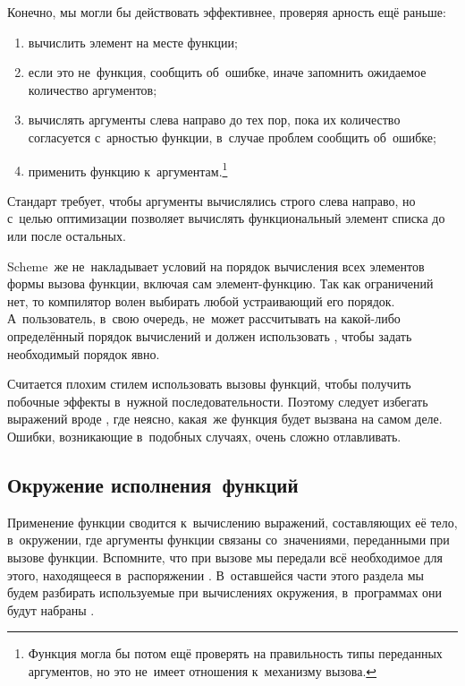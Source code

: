 Конечно, мы могли бы действовать эффективнее, проверяя арность ещё раньше:

\begin{enumerate}
  \item вычислить элемент на месте функции;

  \item если это не~функция, сообщить об~ошибке, иначе запомнить ожидаемое
        количество аргументов;

  \item вычислять аргументы слева направо до тех пор, пока их количество
        согласуется с~арностью функции, в~случае проблем сообщить об~ошибке;

  \item применить функцию к~аргументам.\footnote*{Функция могла бы потом
        ещё проверять на правильность типы переданных аргументов, но это
        не~имеет отношения к~механизму вызова.}
\end{enumerate}

Стандарт {\CommonLisp} требует, чтобы аргументы вычислялись строго слева
направо, но с~целью оптимизации позволяет вычислять функциональный элемент
списка до или после остальных.

Scheme~же не~накладывает условий на порядок вычисления всех элементов формы
вызова функции, включая сам элемент-функцию. Так как ограничений нет, то
компилятор волен выбирать любой устраивающий его порядок.
 А~пользователь, в~свою очередь, не~может
рассчитывать на какой-либо определённый порядок вычислений и должен использовать
, чтобы задать необходимый порядок явно.

Считается плохим стилем использовать вызовы функций, чтобы получить побочные
эффекты в~нужной последовательности. Поэтому следует избегать выражений вроде
, где неясно, какая~же функция будет
вызвана на самом деле. Ошибки, возникающие в~подобных случаях, очень сложно
отлавливать.


\subsection*{Окружение исполнения~функций}

Применение функции сводится к~вычислению выражений, составляющих её тело,
в~окружении, где аргументы функции связаны со~значениями, переданными при вызове
функции. Вспомните, что при вызове  мы передали всё
необходимое для этого, находящееся в~распоряжении . В~оставшейся
части этого раздела мы будем разбирать используемые при вычислениях окружения,
в~программах они будут набраны .


